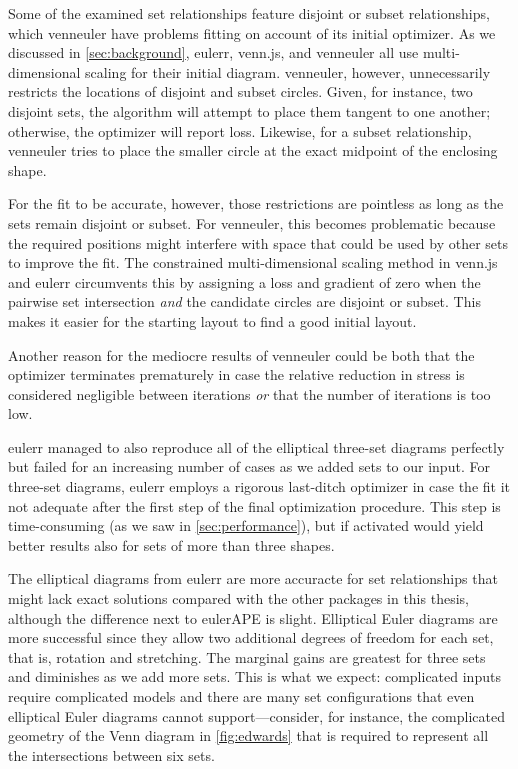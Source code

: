 \documentclass[
  oneside,
  openany,
  numbers=noendperiod,
  parskip=half,
  bibliography=totoc
]{scrbook}\usepackage[]{graphicx}\usepackage{xcolor}
\newcommand{\pkg}[1]{{\fontseries{b}\selectfont #1}}
\begin{document}
Some of the examined set relationships feature disjoint or subset
relationships, which \pkg{venneuler} have problems fitting on account of its
initial optimizer. As we discussed in \cref{sec:background},
\pkg{eulerr}, \pkg{venn.js}, and \pkg{venneuler} all use multi-dimensional scaling for
their initial diagram. \pkg{venneuler}, however, unnecessarily restricts the
locations of disjoint and subset circles. Given, for instance, two disjoint
sets, the algorithm will attempt to place them tangent to one another; otherwise,
the optimizer will report loss. Likewise, for a subset
relationship, \pkg{venneuler} tries to place the smaller circle at the exact
midpoint of the enclosing shape.

For the fit to be accurate, however, those restrictions are pointless as long as
the sets remain disjoint or subset.
For \pkg{venneuler}, this becomes problematic because the required positions might interfere
with space that could be used by other sets to improve the fit. The
constrained multi-dimensional scaling method in \pkg{venn.js} and
\pkg{eulerr} circumvents this by
assigning a loss and gradient of zero when the pairwise set intersection
\emph{and} the candidate circles are disjoint or subset. This makes it easier
for the starting layout to find a good initial layout.

Another reason for the mediocre results of \pkg{venneuler} could be both that the optimizer
terminates prematurely in case the relative reduction in stress is considered negligible
between iterations \emph{or} that the number of iterations is too low.

\pkg{eulerr} managed to also reproduce all of the elliptical
three-set diagrams perfectly but failed for an increasing number of cases as we
added sets to our input.
For three-set diagrams, \pkg{eulerr} employs a rigorous last-ditch
optimizer in case the fit it not adequate after the first step of
the final optimization procedure. This step is
time-consuming (as we saw in \cref{sec:performance}), but if activated
would yield better results also for sets of more than three shapes.

The elliptical diagrams from \pkg{eulerr} are more accuracte for
set relationships that might lack exact solutions compared with the
other packages in this thesis, although the difference next to \pkg{eulerAPE}
is slight. Elliptical Euler diagrams are more successful since they
allow two additional degrees of freedom for each set, that is,
rotation and stretching. The marginal gains
are greatest for three sets and diminishes as we add more sets. This is what we
expect: complicated inputs require
complicated models and there are many set configurations that even elliptical Euler
diagrams cannot support---consider, for instance, the complicated geometry of the
Venn diagram in \cref{fig:edwards} that is required to represent
all the intersections between six sets.
\end{document}
